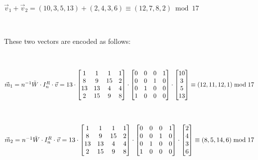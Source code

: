 $\vec{v}_1 + \vec{v}_2 = (10, 3, 5, 13) + (2, 4, 3, 6) \equiv (12, 7, 8, 2) \bmod 17$

$ $

These two vectors are encoded as follows:

$ $

$\vec{m}_1 = n^{-1} \tilde{W} \cdot I_n^R \cdot \vec{v} = 13 \cdot \begin{bmatrix}
1 & 1 & 1 & 1\\
8 & 9 & 15 & 2\\
13 & 13 & 4 & 4\\
2 & 15 & 9 & 8\\
\end{bmatrix} \cdot \begin{bmatrix}
0 & 0 & 0 & 1\\
0 & 0 & 1 & 0\\
0 & 1 & 0 & 0\\
1 & 0 & 0 & 0\\
\end{bmatrix} \cdot \begin{bmatrix}
10\\
3\\
5\\
13\\
\end{bmatrix} \equiv (12, 11, 12, 1)  \bmod 17$

$ $

$\vec{m}_2 = n^{-1} \tilde{W} \cdot I_n^R \cdot \vec{v} = 13 \cdot \begin{bmatrix}
1 & 1 & 1 & 1\\
8 & 9 & 15 & 2\\
13 & 13 & 4 & 4\\
2 & 15 & 9 & 8\\
\end{bmatrix} \cdot \begin{bmatrix}
0 & 0 & 0 & 1\\
0 & 0 & 1 & 0\\
0 & 1 & 0 & 0\\
1 & 0 & 0 & 0\\
\end{bmatrix} \cdot \begin{bmatrix}
2\\
4\\
3\\
6\\
\end{bmatrix} \equiv (8, 5, 14, 6) \bmod 17$

$ $

